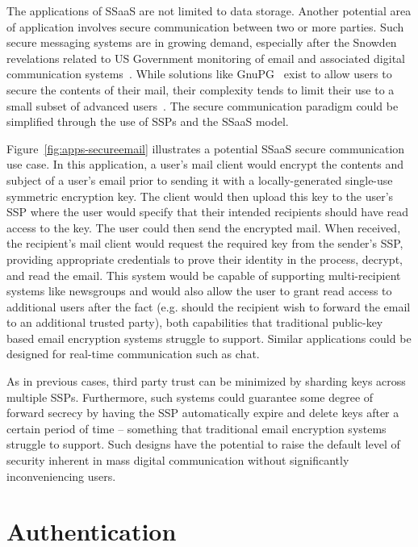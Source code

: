 The applications of SSaaS are not limited to data storage. Another
potential area of application involves secure communication between
two or more parties. Such secure messaging systems are in growing
demand, especially after the Snowden revelations related to US
Government monitoring of email and associated digital communication
systems~\cite{gellman-muscular, greenwald-collect,
  greenwald-prism}. While solutions like GnuPG~\cite{gnupg} exist to
allow users to secure the contents of their mail, their complexity
tends to limit their use to a small subset of advanced
users~\cite{green-challenge, whitten1999}. The secure communication
paradigm could be simplified through the use of SSPs and the SSaaS
model.

Figure~\ref{fig:apps-secureemail} illustrates a potential SSaaS secure
communication use case. In this application, a user's mail client
would encrypt the contents and subject of a user's email prior to
sending it with a locally-generated single-use symmetric encryption
key. The client would then upload this key to the user's SSP where the
user would specify that their intended recipients should have read
access to the key. The user could then send the encrypted mail. When
received, the recipient's mail client would request the required key
from the sender's SSP, providing appropriate credentials to prove
their identity in the process, decrypt, and read the email. This
system would be capable of supporting multi-recipient systems like
newsgroups and would also allow the user to grant read access to
additional users after the fact (e.g. should the recipient wish to
forward the email to an additional trusted party), both capabilities
that traditional public-key based email encryption systems struggle to
support. Similar applications could be designed for real-time
communication such as chat.

As in previous cases, third party trust can be minimized by sharding
keys across multiple SSPs. Furthermore, such systems could guarantee
some degree of forward secrecy by having the SSP automatically expire
and delete keys after a certain period of time -- something that
traditional email encryption systems struggle to support. Such designs
have the potential to raise the default level of security inherent in
mass digital communication without significantly inconveniencing
users.

\section{Authentication}

